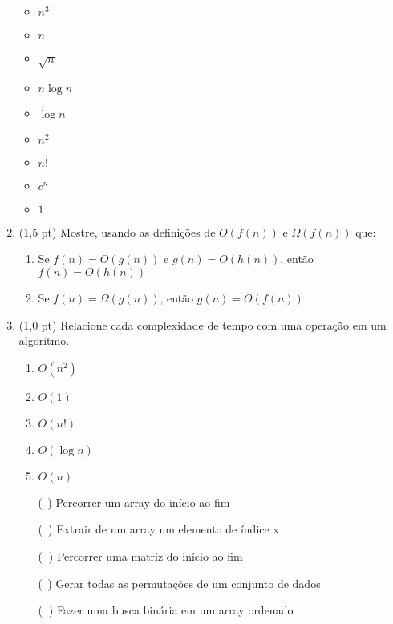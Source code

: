\documentclass[a4paper,10pt]{article}
\begin{document}
\begin{multicols*}{2}
\begin{enumerate}
  \begin{itemize}[noitemsep]
    \item $ n^3 $
    \item $ n $
    \item $ \sqrt{n} $
    \item $ n \log{n} $
    \item $ \log{n} $
    \item $ n^2 $
    \item $ n! $
    \item $ c^n $
    \item $ 1 $
  \end{itemize}

  \item (1,5 pt) Mostre, usando as definições de $ O(f(n)) $ e $ \Omega(f(n)) $ que:

  \begin{enumerate}
    \item Se $ f(n) = O(g(n)) $ e $ g(n) = O(h(n)) $, então $ f(n) = O(h(n)) $
    \item Se $ f(n) = \Omega(g(n)) $, então $ g(n) = O(f(n)) $
  \end{enumerate}

  \vfill\null
  \columnbreak

  \item (1,0 pt) Relacione cada complexidade de tempo com uma operação em um algoritmo.

  \begin{enumerate}
    \item $ O(n^2) $
    \item $ O(1) $
    \item $ O(n!) $
    \item $ O(\log{n}) $
    \item $ O(n) $
  \end{enumerate}

  \begin{enumerate}
    \item [(\textcolor{white}{c})] Percorrer um array do início ao fim
    \item [(\textcolor{white}{a})] Extrair de um array um elemento de índice x
    \item [(\textcolor{white}{d})] Percorrer uma matriz do início ao fim
    \item [(\textcolor{white}{e})] Gerar todas as permutações de um conjunto de dados
    \item [(\textcolor{white}{b})] Fazer uma busca binária em um array ordenado
  \end{enumerate}


\end{enumerate}
\end{multicols*}
\end{document}
